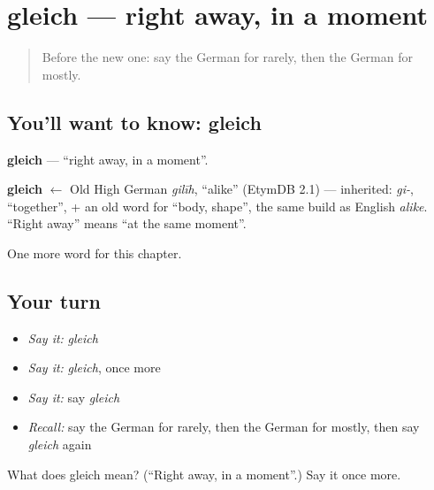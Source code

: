 \section[gleich]{gleich — right away, in a moment}

\label{lesson:GE-C170-gleich}



\begin{quote}
Before the new one: say the German for rarely, then the German for mostly.
\end{quote}

\subsection*{You'll want to know: gleich}
\textbf{gleich} — \textquotedblleft{}right away, in a moment\textquotedblright{}.

\begin{cousinweb}
\textbf{gleich} $\leftarrow$ Old High German \emph{gilīh}, \textquotedblleft{}alike\textquotedblright{} (EtymDB 2.1) — inherited: \emph{gi-}, \textquotedblleft{}together\textquotedblright{}, + an old word for \textquotedblleft{}body, shape\textquotedblright{}, the same build as English \emph{alike}. \textquotedblleft{}Right away\textquotedblright{} means \textquotedblleft{}at the same moment\textquotedblright{}.
\end{cousinweb}

\begin{grammarlens}[title={What you've built}]
One more word for this chapter.
\end{grammarlens}

\subsection*{Your turn}
\begin{itemize}
\raggedright
  \item \emph{Say it:} \emph{gleich}
  \item \emph{Say it:} \emph{gleich}, once more
  \item \emph{Say it:} say \emph{gleich}
  \item \emph{Recall:} say the German for rarely, then the German for mostly, then say \emph{gleich} again
\end{itemize}

\begin{tcolorbox}[breakable,colback=teal!4,colframe=teal!35!black,title={Before you move on}]
What does gleich mean? (\textquotedblleft{}Right away, in a moment\textquotedblright{}.) Say it once more.
\end{tcolorbox}
